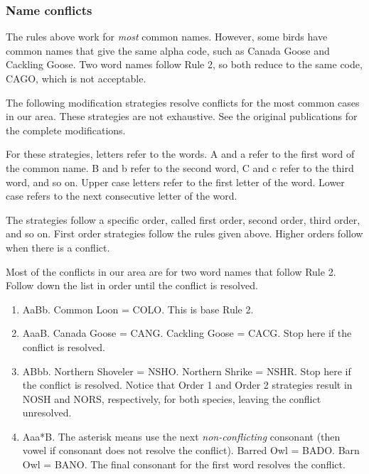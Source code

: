 \documentclass[11pt]{article}
\begin{document}
\subsubsection*{Name conflicts}

The rules above work for \emph{most} common names. However, some birds have common names that give the same alpha code, such as Canada Goose and Cackling Goose. Two word names follow Rule 2, so both reduce to the same code, CAGO, which is not acceptable.

The following modification strategies resolve conflicts for the most common cases in our area.  These strategies are not exhaustive. See the original publications for the complete modifications.

For these strategies, letters refer to the words. A and a refer to the first word of the common name. B and b refer to the second word, C and c refer to the third word, and so on. Upper case letters refer to the first letter of the word. Lower case refers to the next consecutive letter of the word.

The strategies follow a specific order, called first order, second order, third order, and so on. First order strategies follow the rules given above. Higher orders follow when there is a conflict.

Most of the conflicts in our area are for two word names that follow Rule 2. Follow down the list in order until the conflict is resolved.

\begin{enumerate}[label={Order \arabic*:}]
\item AaBb. Common Loon = COLO. This is base Rule 2.

\item AaaB. Canada Goose = CANG. Cackling Goose = CACG. Stop here if the conflict is resolved.

\item ABbb. Northern Shoveler = NSHO. Northern Shrike = NSHR. Stop here if the conflict is resolved. Notice that Order 1 and Order 2 strategies result in NOSH and NORS, respectively, for both species, leaving the conflict unresolved. 

\item Aaa*B. The asterisk means use the next \emph{non-conflicting} consonant (then vowel if consonant does not resolve the conflict). Barred Owl = BADO. Barn Owl = BANO. The final consonant for the first word resolves the conflict. 

\end{enumerate}
\end{document}
